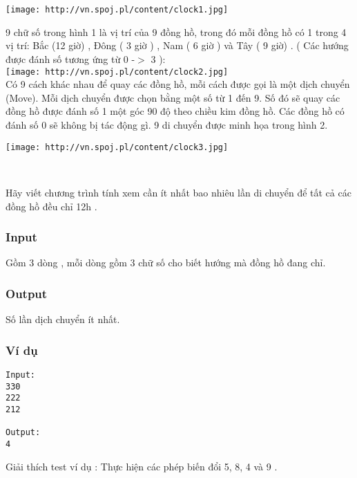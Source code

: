 

 

 


\texttt{[image: http://vn.spoj.pl/content/clock1.jpg]}

9 chữ số trong hình 1 là vị trí của 9 đồng hồ, trong đó mỗi đồng hồ có 1 trong 4 vị trí: Bắc (12 giờ) , Đông ( 3 giờ ) , Nam ( 6 giờ ) và Tây ( 9 giờ) . ( Các hướng được đánh số tương ứng từ 0 -$>$ 3 ):
\\
\texttt{[image: http://vn.spoj.pl/content/clock2.jpg]}
\\Có 9 cách khác nhau để quay các đồng hồ, mỗi cách được gọi là một dịch chuyển (Move). Mỗi dịch chuyển được chọn bằng một số từ 1 đến 9. Số đó sẽ quay các đồng hồ được đánh số 1 một góc 90 độ theo chiều kim đồng hồ. Các đồng hồ có đánh số 0 sẽ không bị tác động gì. 9 di chuyển được minh họa trong hình 2.


\texttt{[image: http://vn.spoj.pl/content/clock3.jpg]}

 

Hãy viết chương trình tính xem cần ít nhất bao nhiêu lần di chuyển để tất cả các đồng hồ đều chỉ 12h .

\subsubsection{Input}

Gồm 3 dòng , mỗi dòng gồm 3 chữ số cho biết hướng mà đồng hồ đang chỉ.

\subsubsection{Output}

Số lần dịch chuyển ít nhất.

\subsubsection{Ví dụ}
\begin{verbatim}
Input:
330
222
212

Output:
4
\end{verbatim}

Giải thích test ví dụ : Thực hiện các phép biến đổi 5, 8, 4 và 9 .